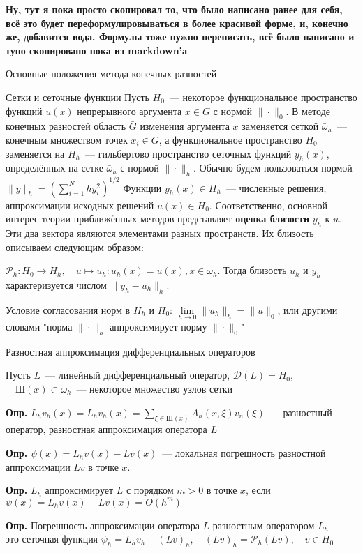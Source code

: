 \textbf{Ну, тут я пока просто скопировал то, что было написано ранее для себя, всё это будет переформулировываться в более красивой форме, и, конечно же, добавится вода.
Формулы тоже нужно переписать, всё было написано и тупо скопировано пока из markdown'а}
    
Основные положения метода конечных разностей

Сетки и сеточные функции
Пусть $H_0$~--- некоторое функциональное пространство функций $u(x)$ непрерывного аргумента $x \in G$ с нормой $\|\cdot\|_0$.
В методе конечных разностей область $\bar{G}$ изменения аргумента $x$ заменяется сеткой $\bar{\omega}_h$~--- конечным множеством точек $x_i \in \bar{G}$,
а функциональное пространство $H_0$ заменяется на $H_h$~--- гильбертово пространство сеточных функций $y_h(x)$, определённых на сетке $\bar{\omega}_h$ с нормой $\|\cdot\|_h$.
Обычно будем пользоваться нормой $\|y\|_h = \left( \sum\limits_{i = 1}^{N} h y_i^2 \right)^{1/2}$
Функции $y_h(x) \in H_h$~--- численные решения, аппроксимации исходных решений $u(x) \in H_0$.
Соответственно, основной интерес теории приближённых методов представляет \textbf{оценка близости} $y_h$ к $u$.
Эти два вектора являются элементами разных пространств. Их близость описываем следующим образом:

$\mathcal{P}_h: H_0 \rightarrow H_h,\quad u \mapsto u_h: u_h(x) = u(x), x \in \bar{\omega}_h$.
Тогда близость $u_h$ и $y_h$ характеризуется числом $\|y_h - u_h\|_h$.

Условие согласования норм в $H_h$ и $H_0$:
$\lim\limits_{h \rightarrow 0} \|u_h\|_h = \| u\|_0$, или другими словами "норма $\|\cdot\|_h$ аппроксимирует норму $\|\cdot\|_0$"


Разностная аппроксимация дифференциальных операторов

Пусть $L$~--- линейный дифференциальный оператор, $\mathcal{D}(L) = H_0$, $\quad Ш(x) \subset \bar{\omega}_h$~--- некоторое множество узлов сетки

\textbf{Опр.} $L_h v_h (x) = L_h v_h(x) = \sum\limits_{\xi \in Ш(x)} A_h(x, \xi) v_n (\xi)$~--- разностный оператор, разностная аппроксимация оператора $L$

\textbf{Опр.} $\psi(x) = L_h v(x) - L v(x)$~--- локальная погрешность разностной аппроксимации $Lv$ в точке $x$.

\textbf{Опр.} $L_h$ аппроксимирует $L$ с порядком $ m > 0$ в точке $x$, если $\psi(x) = L_h v(x) - Lv(x) = O(h^m)$

\textbf{Опр.} Погрешность аппроксимации оператора $L$ разностным оператором $L_h$~--- это сеточная функция
$\psi_h = L_h v_h - (Lv)_h, \quad (Lv)_h = \mathcal{P}_h (Lv), \quad v \in H_0$

